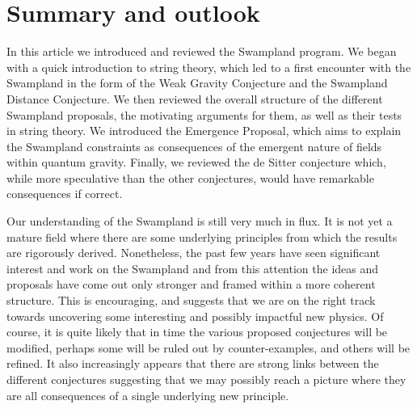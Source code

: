 \documentclass[11pt,a4paper]{article}
\numberwithin{equation}{section}
\numberwithin{table}{section}\setlength{\multlinegap}{25pt}
\begin{document}
{%
\section{Summary and outlook}
\label{sec:summary}

In this article we introduced and reviewed the Swampland program. We began with a quick introduction to string theory, which led to a first encounter with the Swampland in the form of the Weak Gravity Conjecture and the Swampland Distance Conjecture. We then reviewed the overall structure of the different Swampland proposals, the motivating arguments for them, as well as their tests in string theory. We introduced the Emergence Proposal, which aims to explain the Swampland constraints as consequences of the emergent nature of fields within quantum gravity. Finally, we reviewed the de Sitter conjecture which, while more speculative than the other conjectures, would have remarkable consequences if correct. 

Our understanding of the Swampland is still very much in flux. It is not yet a mature field where there are some underlying principles from which the results are rigorously derived. Nonetheless, the past few years have seen significant interest and work on the Swampland and from this attention the ideas and proposals have come out only stronger and framed within a more coherent structure. This is encouraging, and suggests that we are on the right track towards uncovering some interesting and possibly impactful new physics. Of course, it is quite likely that in time the various proposed conjectures will be modified, perhaps some will be ruled out by counter-examples, and others will be refined. It also increasingly appears that there are strong links between the different conjectures suggesting that we may possibly reach a picture where they are all consequences of a single underlying new principle. 


}
\end{document}
